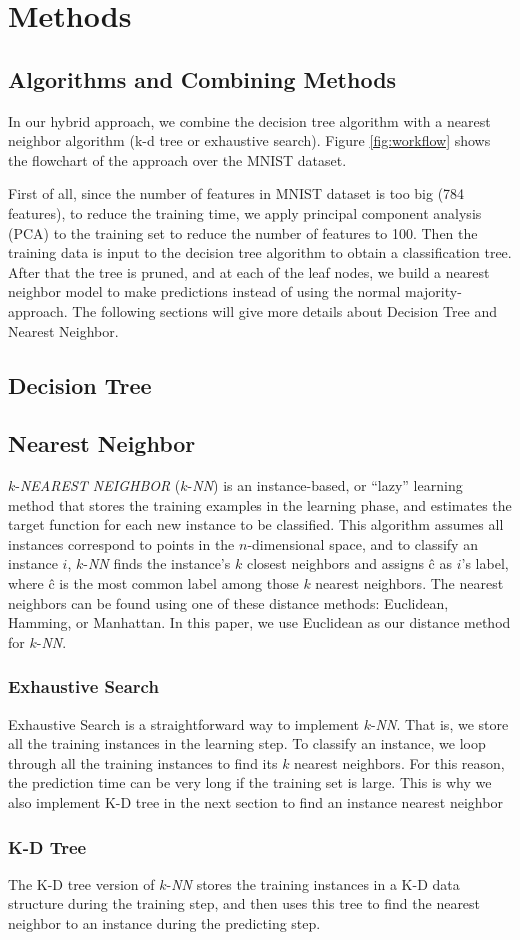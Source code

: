 \section{Methods}
	\subsection{Algorithms and Combining Methods}
		In our hybrid approach, we combine the decision tree algorithm with a nearest neighbor algorithm (k-d tree or exhaustive search). Figure \ref{fig:workflow} shows the flowchart of the approach over the MNIST dataset. 
		
		First of all, since the number of features in MNIST dataset is too big (784 features), to reduce the training time, we apply principal component analysis (PCA) to the training set to reduce the number of features to 100. Then the training data is input to the decision tree algorithm to obtain a classification tree. After that the tree is pruned, and at each of the leaf nodes, we build a nearest neighbor model to make predictions instead of using the normal majority-approach. The following sections will give more details about Decision Tree and Nearest Neighbor.
		
	\subsection{Decision Tree}
    
	\subsection{Nearest Neighbor}
		$k$-\textit{NEAREST NEIGHBOR} ($k$-\textit{NN}) is an instance-based, or ``lazy'' learning method that stores the training examples in the learning phase, and estimates the target function for each new instance to be classified. This algorithm assumes all instances correspond to points in the $n$-dimensional space, and to classify an instance $i$, $k$-\textit{NN} finds the instance's $k$ closest neighbors and assigns \^{c} as $i$'s label, where \^{c} is the most common label among those $k$ nearest neighbors. The nearest neighbors can be found using one of these distance methods: Euclidean, Hamming, or Manhattan. In this paper, we use Euclidean as our distance method for $k$-\textit{NN}.
		\subsubsection{Exhaustive Search}
		Exhaustive Search is a straightforward way to implement $k$-\textit{NN}. That is, we store all the training instances in the learning step. To classify an instance, we loop through all the training instances to find its $k$ nearest neighbors. For this reason, the prediction time can be very long if the training set is large. This is why we also implement K-D tree in the next section to find an instance nearest neighbor
		
		\subsubsection{K-D Tree}
		The K-D tree version of $k$-\textit{NN} stores the training instances in a K-D data structure during the training step, and then uses this tree to find the nearest neighbor to an instance during the predicting step.
		

